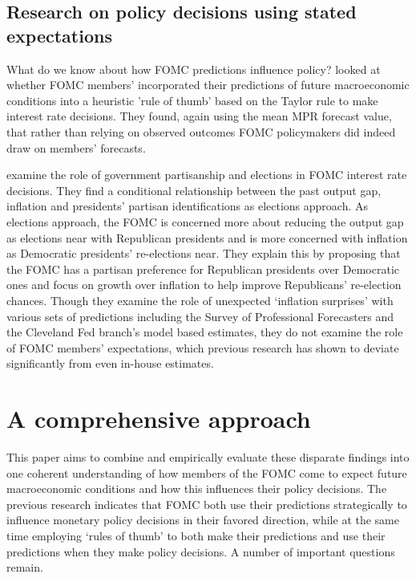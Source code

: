 \documentclass[a4paper]{article}\usepackage{graphicx, color}
\begin{document}
\subsection{Research on policy decisions using stated expectations}

What do we know about how FOMC predictions influence policy? \cite{Orphanides2008} looked at whether FOMC members' incorporated their predictions of future macroeconomic conditions into  a heuristic 'rule of thumb' based on the Taylor rule \cite[see][]{Taylor1993} to make interest rate decisions. They found, again using the mean MPR forecast value, that rather than relying on observed outcomes FOMC policymakers did indeed draw on members' forecasts.   

\cite{Clark2013} examine the role of government partisanship and elections in FOMC interest rate decisions. They find a conditional relationship between the past output gap, inflation and presidents' partisan identifications as elections approach. As elections approach, the FOMC is concerned more about reducing the output gap as elections near with Republican presidents and is more concerned with inflation as Democratic presidents' re-elections near. They explain this by proposing that the FOMC has a partisan preference for Republican presidents over Democratic ones and focus on growth over inflation to help improve Republicans' re-election chances. Though they examine the role of unexpected `inflation surprises' with various sets of predictions including the Survey of Professional Forecasters and the Cleveland Fed branch's model based estimates, they do not examine the role of FOMC members' expectations, which previous research has shown to deviate significantly from even in-house estimates.


\section{A comprehensive approach} 

This paper aims to combine and empirically evaluate these disparate findings into one coherent understanding of how members of the FOMC come to expect future macroeconomic conditions and how this influences their policy decisions. The previous research indicates that FOMC both use their predictions strategically to influence monetary policy decisions in their favored direction, while at the same time employing `rules of thumb' to both make their predictions and use their predictions when they make policy decisions. A number of important questions remain. 
\end{document}

